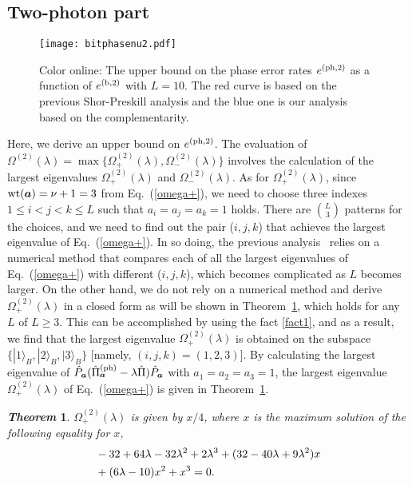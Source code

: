 \documentclass[prl,twocolumn,superscriptaddress,nofootinbib]{revtex4}
\newtheorem{theorem}{{\it \bf Theorem}}
\def\U#1{{\rm #1}}
\newcommand{\ket}[1]{| #1 \rangle}
\begin{document}
\subsection{Two-photon part}
\label{sec:two}
\begin{figure}[t]
\texttt{[image: bitphasenu2.pdf]}
\caption{
  Color online: 
  The upper bound on the phase error rates $e^{(\U{ph},2)}$ as a function of $e^{(\U{b},2)}$ with $L=10$. 
  The red curve is based on the previous Shor-Preskill analysis and the blue one is our analysis based on the complementarity.
}
\label{fig:two}
\end{figure}
Here, we derive an upper bound on $e^{(\U{ph},2)}$.
The evaluation of $\Omega^{(2)}(\lambda)=\max\{\Omega^{(2)}_+(\lambda),\Omega^{(2)}_-(\lambda)\}$ involves
the calculation of the largest eigenvalues $\Omega_+^{(2)}(\lambda)$ and $\Omega_-^{(2)}(\lambda)$. 
As for $\Omega_+^{(2)}(\lambda)$, since $\U{wt}({\bm{a}})=\nu+1=3$ from Eq.~(\ref{omega+}), 
we need to choose three indexes $1\leq i<j<k\leq L$ such that $a_i=a_j=a_k=1$ holds. 
There are $\binom L3$ patterns for the choices, and we need to find out the pair ($i,j,k$) that achieves 
the largest eigenvalue of Eq.~(\ref{omega+}). 
In so doing, the previous analysis~\cite{Kiyoshi2012dps} relies on a numerical method that compares each of
all the largest eigenvalues of Eq.~(\ref{omega+}) with different ($i,j,k$), which becomes complicated 
as $L$ becomes larger. 
On the other hand, we do not rely on a numerical method and derive $\Omega_+^{(2)}(\lambda)$ in a closed form as will be shown in
Theorem~\ref{lemma2}, which holds for any $L$ of $L\geq3$. 
This can be accomplished by using the fact \ref{fact1}, and as a result, 
we find that the largest eigenvalue $\Omega^{(2)}_+(\lambda)$ is obtained on the subspace 
$\{\ket{1}_B,\ket{2}_B,\ket{3}_B\}$ [namely, $(i,j,k)=(1,2,3)$]. 
By calculating the largest eigenvalue of 
$\hat{P}_{\bm{a}}(\hat{\Pi}^{\U{(ph)}}_{\bm{a}}-\lambda\hat{\Pi})\hat{P}_{\bm{a}}$ with $a_1=a_2=a_3=1$, 
the largest eigenvalue $\Omega_+^{(2)}(\lambda)$ of Eq.~(\ref{omega+}) is given in Theorem~\ref{lemma2}. 
  \begin{theorem}
  \label{lemma2}
  $\Omega_+^{(2)}(\lambda)$ is given by $x/4$, where $x$ is the maximum solution of the following equality for $x$,
\begin{align}
  &-32+64\lambda-32\lambda^2+2\lambda^3+(32-40\lambda+9\lambda^2)x\notag\\
  &+(6\lambda-10)x^2+x^3=0.
  \end{align}
  \end{theorem}
\end{document}
